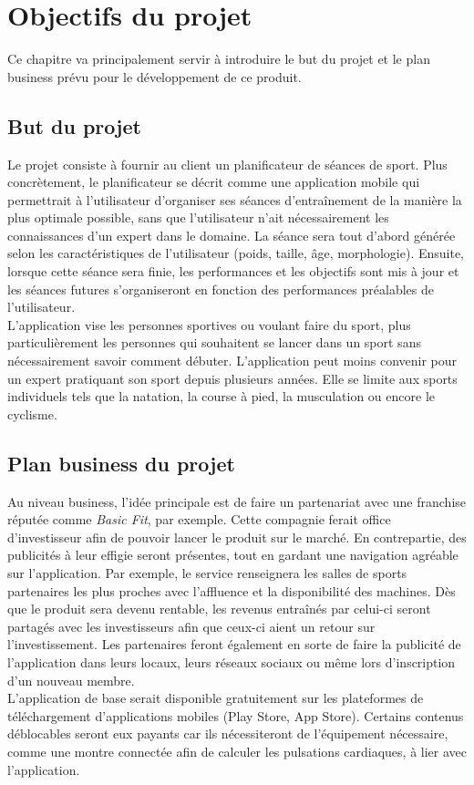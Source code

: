 \chapter{Objectifs du projet}

Ce chapitre va principalement servir à introduire le but du projet et le plan business prévu pour le développement de ce produit.

\section{But du projet}

Le projet consiste à fournir au client un planificateur de séances de sport. Plus concrètement, le planificateur se décrit comme une application mobile qui permettrait à l'utilisateur d'organiser ses séances d'entraînement de la manière la plus optimale possible, sans que l'utilisateur n'ait nécessairement les connaissances d'un expert dans le domaine. La séance sera tout d'abord générée selon les caractéristiques de l'utilisateur (poids, taille, âge, morphologie). Ensuite, lorsque cette séance sera finie, les performances et les objectifs sont mis à jour et les séances futures s'organiseront en fonction des performances préalables de l'utilisateur.\\

L'application vise les personnes sportives ou voulant faire du sport, plus particulièrement les personnes qui souhaitent se lancer dans un sport sans né\-ces\-sai\-re\-ment savoir comment débuter. L'application peut moins convenir pour un expert pratiquant son sport depuis plusieurs années. Elle se limite aux sports individuels tels que la natation, la course à pied, la musculation ou encore le cyclisme. 

\section{Plan business du projet}

Au niveau business, l'idée principale est de faire un partenariat avec une franchise réputée comme \textit{Basic Fit}, par exemple. Cette compagnie ferait office d'investisseur afin de pouvoir lancer le produit sur le marché. En contrepartie, des publicités à leur effigie seront présentes, tout en gardant une navigation agréable sur l'application. Par exemple, le service renseignera les salles de sports partenaires les plus proches avec l'affluence et la disponibilité des machines. Dès que le produit sera devenu rentable, les revenus entraînés par celui-ci seront partagés avec les investisseurs afin que ceux-ci aient un retour sur l'investissement. Les partenaires feront également en sorte de faire la publicité de l'application dans leurs locaux, leurs réseaux sociaux ou même lors d'inscription d'un nouveau membre.\\

L'application de base serait disponible gratuitement sur les plateformes de téléchargement d'applications mobiles (Play Store, App Store). Certains contenus déblocables seront eux payants car ils nécessiteront de l'équipement né\-ces\-saire, comme une montre connectée afin de calculer les pulsations cardiaques, à lier avec l'application.